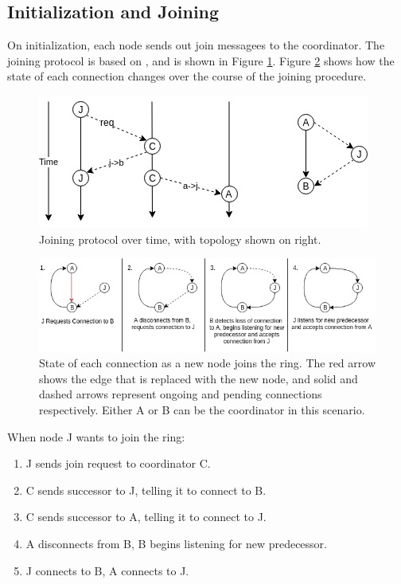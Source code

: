 \documentclass[12pt]{article}
\begin{document}
\subsection{Initialization and Joining}

On initialization, each node sends out join messagees to the coordinator. The
joining protocol is based on \cite{join}, and is shown in Figure \ref{fig:join}.
Figure \ref{fig:bigjoin} shows how the state of each connection changes over the course of
the joining procedure.

\begin{figure}[!ht]
\centering
  \centering
  \includegraphics[width=.8\linewidth]{images/join}
  \caption{Joining protocol over time, with topology shown on right.}
\label{fig:join}
\end{figure}

\begin{figure}[!ht]
  \centering
  \includegraphics[width=\linewidth]{images/bigflow}
  \caption{State of each connection as a new node joins the ring. The red arrow
shows the edge that is replaced with the new node, and solid and dashed
arrows represent ongoing and pending connections respectively. Either A or
B can be the coordinator in this scenario.}
\label{fig:bigjoin}
\end{figure}
\FloatBarrier

\noindent When node J wants to join the ring:
\begin{enumerate}
    \item J sends join request to coordinator C.
    \item C sends successor to J, telling it to connect to B.
    \item C sends successor to A, telling it to connect to J. 
    \item A disconnects from B, B begins listening for new predecessor.
    \item J connects to B, A connects to J.
\end{enumerate}
\end{document}
